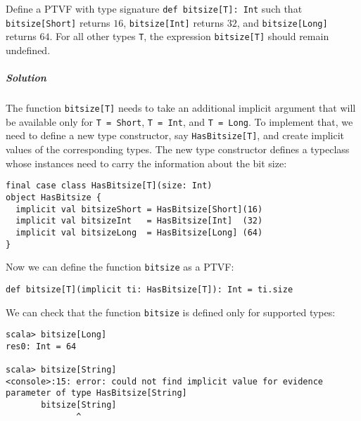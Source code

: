 Define a PTVF with type signature \lstinline!def bitsize[T]: Int!
such that \lstinline!bitsize[Short]! returns $16$, \lstinline!bitsize[Int]!
returns $32$, and \lstinline!bitsize[Long]! returns $64$. For all
other types \lstinline!T!, the expression \lstinline!bitsize[T]!
should remain undefined.

\subparagraph{Solution}

The function \lstinline!bitsize[T]! needs to take an additional implicit
argument that will be available only for \lstinline!T = Short!, \lstinline!T = Int!,
and \lstinline!T = Long!. To implement that, we need to define a
new type constructor, say \lstinline!HasBitsize[T]!, and create implicit
values of the corresponding types. The new type constructor defines
a typeclass whose instances need to carry the information about the
bit size:
\begin{lstlisting}
final case class HasBitsize[T](size: Int)
object HasBitsize {
  implicit val bitsizeShort = HasBitsize[Short](16)
  implicit val bitsizeInt   = HasBitsize[Int]  (32)
  implicit val bitsizeLong  = HasBitsize[Long] (64)
}
\end{lstlisting}
Now we can define the function \lstinline!bitsize! as a PTVF:
\begin{lstlisting}
def bitsize[T](implicit ti: HasBitsize[T]): Int = ti.size
\end{lstlisting}

We can check that the function \lstinline!bitsize! is defined only
for supported types:
\begin{lstlisting}
scala> bitsize[Long]
res0: Int = 64

scala> bitsize[String]
<console>:15: error: could not find implicit value for evidence parameter of type HasBitsize[String]
       bitsize[String]
              ^ 
\end{lstlisting}

